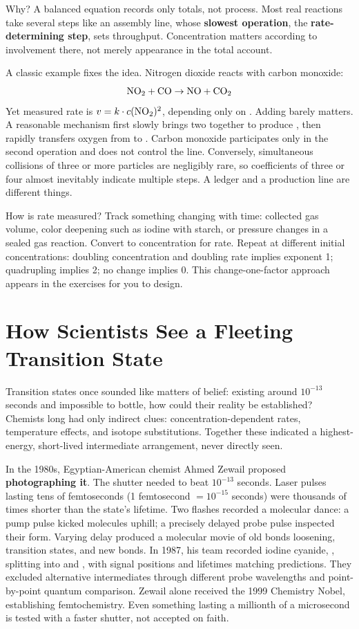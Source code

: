Why? A balanced equation records only totals, not process. Most real reactions take several steps like an assembly line, whose \textbf{slowest operation}, the \textbf{rate-determining step}, sets throughput. Concentration matters according to involvement there, not merely appearance in the total account.

A classic example fixes the idea. Nitrogen dioxide reacts with carbon monoxide:
\[\mathrm{NO_2} + \mathrm{CO} \rightarrow \mathrm{NO} + \mathrm{CO_2}\]
Yet measured rate is $v = k \cdot c(\mathrm{NO_2})^{2}$, depending only on . Adding  barely matters. A reasonable mechanism first slowly brings two  together to produce , then rapidly transfers oxygen from  to . Carbon monoxide participates only in the second operation and does not control the line. Conversely, simultaneous collisions of three or more particles are negligibly rare, so coefficients of three or four almost inevitably indicate multiple steps. A ledger and a production line are different things.

How is rate measured? Track something changing with time: collected gas volume, color deepening such as iodine with starch, or pressure changes in a sealed gas reaction. Convert to concentration for rate. Repeat at different initial concentrations: doubling concentration and doubling rate implies exponent 1; quadrupling implies 2; no change implies 0. This change-one-factor approach appears in the exercises for you to design.

\section{How Scientists See a Fleeting Transition State}

\begin{zhengju}
Transition states once sounded like matters of belief: existing around $10^{-13}$ seconds and impossible to bottle, how could their reality be established? Chemists long had only indirect clues: concentration-dependent rates, temperature effects, and isotope substitutions. Together these indicated a highest-energy, short-lived intermediate arrangement, never directly seen.

In the 1980s, Egyptian-American chemist Ahmed Zewail proposed \textbf{photographing it}. The shutter needed to beat $10^{-13}$ seconds. Laser pulses lasting tens of femtoseconds (1 femtosecond $= 10^{-15}$ seconds) were thousands of times shorter than the state's lifetime. Two flashes recorded a molecular dance: a pump pulse kicked molecules uphill; a precisely delayed probe pulse inspected their form. Varying delay produced a molecular movie of old bonds loosening, transition states, and new bonds. In 1987, his team recorded iodine cyanide, , splitting into  and , with signal positions and lifetimes matching predictions. They excluded alternative intermediates through different probe wavelengths and point-by-point quantum comparison. Zewail alone received the 1999 Chemistry Nobel, establishing femtochemistry. Even something lasting a millionth of a microsecond is tested with a faster shutter, not accepted on faith.
\end{zhengju}

